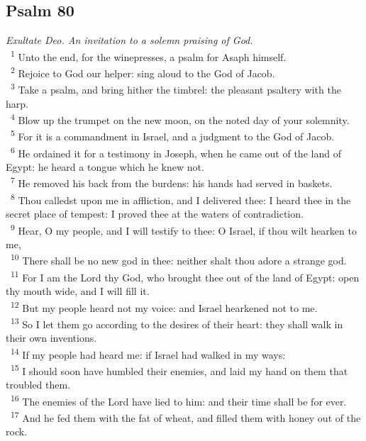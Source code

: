 \documentclass[a5paper,12pt]{article}
\begin{document}
\begin{multicols*}{2}
\section{Psalm 80}
\label{sec:org9aeb667}
\emph{Exultate Deo. An invitation to a solemn praising of God.}\\

~\textsuperscript{1} Unto the end, for the winepresses, a psalm for Asaph himself.\\
~\textsuperscript{2} Rejoice to God our helper: sing aloud to the God of Jacob.\\
~\textsuperscript{3} Take a psalm, and bring hither the timbrel: the pleasant psaltery with the harp.\\
~\textsuperscript{4} Blow up the trumpet on the new moon, on the noted day of your solemnity.\\
~\textsuperscript{5} For it is a commandment in Israel, and a judgment to the God of Jacob.\\
~\textsuperscript{6} He ordained it for a testimony in Joseph, when he came out of the land of Egypt: he heard a tongue which he knew not.\\
~\textsuperscript{7} He removed his back from the burdens: his hands had served in baskets.\\
~\textsuperscript{8} Thou calledst upon me in affliction, and I delivered thee: I heard thee in the secret place of tempest: I proved thee at the waters of contradiction.\\
~\textsuperscript{9} Hear, O my people, and I will testify to thee: O Israel, if thou wilt hearken to me,\\
~\textsuperscript{10} There shall be no new god in thee: neither shalt thou adore a strange god.\\
~\textsuperscript{11} For I am the Lord thy God, who brought thee out of the land of Egypt: open thy mouth wide, and I will fill it.\\
~\textsuperscript{12} But my people heard not my voice: and Israel hearkened not to me.\\
~\textsuperscript{13} So I let them go according to the desires of their heart: they shall walk in their own inventions.\\
~\textsuperscript{14} If my people had heard me: if Israel had walked in my ways:\\
~\textsuperscript{15} I should soon have humbled their enemies, and laid my hand on them that troubled them.\\
~\textsuperscript{16} The enemies of the Lord have lied to him: and their time shall be for ever.\\
~\textsuperscript{17} And he fed them with the fat of wheat, and filled them with honey out of the rock.\\


\end{multicols*}
\end{document}
